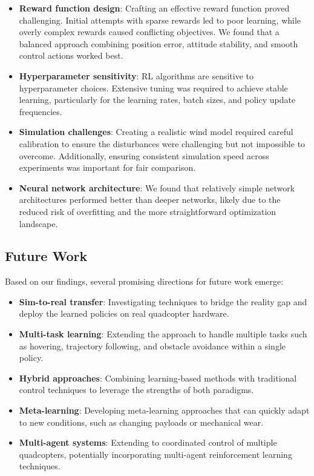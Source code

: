 \documentclass[12pt]{article}
\begin{document}
\begin{itemize}
    \item \textbf{Reward function design}: Crafting an effective reward function proved challenging. Initial attempts with sparse rewards led to poor learning, while overly complex rewards caused conflicting objectives. We found that a balanced approach combining position error, attitude stability, and smooth control actions worked best.
    
    \item \textbf{Hyperparameter sensitivity}: RL algorithms are sensitive to hyperparameter choices. Extensive tuning was required to achieve stable learning, particularly for the learning rates, batch sizes, and policy update frequencies.
    
    \item \textbf{Simulation challenges}: Creating a realistic wind model required careful calibration to ensure the disturbances were challenging but not impossible to overcome. Additionally, ensuring consistent simulation speed across experiments was important for fair comparison.
    
    \item \textbf{Neural network architecture}: We found that relatively simple network architectures performed better than deeper networks, likely due to the reduced risk of overfitting and the more straightforward optimization landscape.
\end{itemize}

\subsection{Future Work}

Based on our findings, several promising directions for future work emerge:

\begin{itemize}
    \item \textbf{Sim-to-real transfer}: Investigating techniques to bridge the reality gap and deploy the learned policies on real quadcopter hardware.
    
    \item \textbf{Multi-task learning}: Extending the approach to handle multiple tasks such as hovering, trajectory following, and obstacle avoidance within a single policy.
    
    \item \textbf{Hybrid approaches}: Combining learning-based methods with traditional control techniques to leverage the strengths of both paradigms.
    
    \item \textbf{Meta-learning}: Developing meta-learning approaches that can quickly adapt to new conditions, such as changing payloads or mechanical wear.
    
    \item \textbf{Multi-agent systems}: Extending to coordinated control of multiple quadcopters, potentially incorporating multi-agent reinforcement learning techniques.
\end{itemize}
\end{document}
